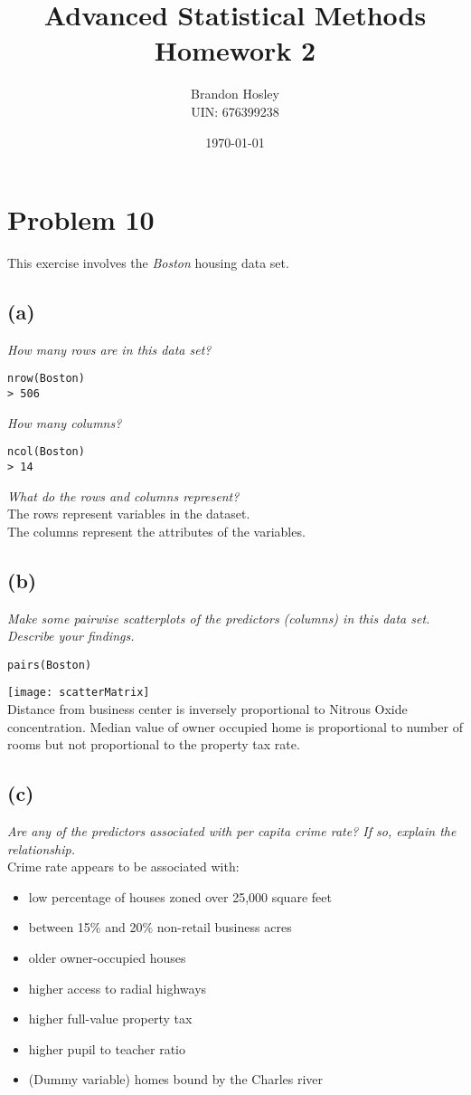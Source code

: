 \documentclass[a4paper,man,natbib]{apa6}
\title{Advanced Statistical Methods Homework 2}
\author{Brandon Hosley \\ UIN: 676399238}
\date{\today}
\affiliation{University of Illinois - Springfield}
\begin{document}
\maketitle
\singlespacing

\section{Problem 10}
This exercise involves the \emph{Boston} housing data set.

\subsection{(a)}
\emph{How many rows are in this data set?} \\
\begin{verbatim}
nrow(Boston)
> 506
\end{verbatim}
\emph{How many columns?}  \\
\begin{verbatim}
ncol(Boston)
> 14
\end{verbatim}
\emph{What do the rows and columns represent?} \\
The rows represent variables in the dataset. \\
The columns represent the attributes of the variables. \\

\subsection{(b)}
\emph{Make some pairwise scatterplots of the predictors (columns) in
this data set. Describe your findings.}
\begin{verbatim}
pairs(Boston)
\end{verbatim}
\texttt{[image: scatterMatrix]} \\
Distance from business center is inversely proportional to Nitrous Oxide concentration.
Median value of owner occupied home is proportional to number of rooms but not proportional to the property tax rate.

\subsection{(c)}
\emph{Are any of the predictors associated with per capita crime rate?
If so, explain the relationship.} \\
Crime rate appears to be associated with:
\begin{itemize}
	\item low percentage of houses zoned over 25,000 square feet
	\item between 15\% and 20\% non-retail business acres
	\item older owner-occupied houses
	\item higher access to radial highways
	\item higher full-value property tax
	\item higher pupil to teacher ratio
	\item (Dummy variable) homes bound by the Charles river 
\end{itemize}
\end{document}
